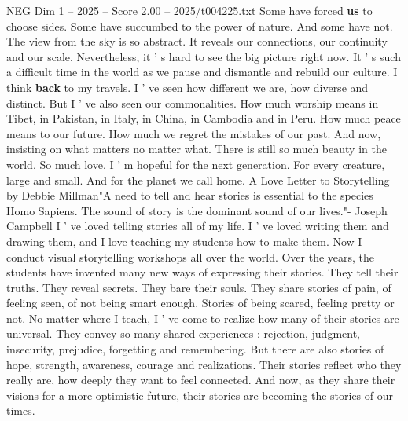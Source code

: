 \begin{textsample}{NEG Dim 1 – 2025 – Score 2.00 – 2025/t004225.txt}
Some have forced \textbf{us} to choose sides.
Some have succumbed to the power of nature.
And some have not.
The view from the sky is so abstract.
It reveals our connections, our continuity and our scale.
Nevertheless, it ' s hard to see the big picture right now.
It ' s such a difficult time in the world as we pause and dismantle and rebuild our culture.
I think \textbf{back} to my travels.
I ' ve seen how different we are, how diverse and distinct.
But I ' ve also seen our commonalities.
How much worship means in Tibet, in Pakistan, in Italy, in China, in Cambodia and in Peru.
How much peace means to our future.
How much we regret the mistakes of our past.
And now, insisting on what matters no matter what.
There is still so much beauty in the world.
So much love.
I ' m hopeful for the next generation.
For every creature, large and small.
And for the planet we call home.
A Love Letter to Storytelling by Debbie Millman"A need to tell and hear stories is essential to the species Homo Sapiens.
The sound of story is the dominant sound of our lives."- Joseph Campbell I ' ve loved telling stories all of my life.
I ' ve loved writing them and drawing them, and I love teaching my students how to make them.
Now I conduct visual storytelling workshops all over the world.
Over the years, the students have invented many new ways of expressing their stories.
They tell their truths.
They reveal secrets.
They bare their souls.
They share stories of pain, of feeling seen, of not being smart enough.
Stories of being scared, feeling pretty or not.
No matter where I teach, I ' ve come to realize how many of their stories are universal.
They convey so many shared experiences : rejection, judgment, insecurity, prejudice, forgetting and remembering.
But there are also stories of hope, strength, awareness, courage and realizations.
Their stories reflect who they really are, how deeply they want to feel connected.
And now, as they share their visions for a more optimistic future, their stories are becoming the stories of our times.

\end{textsample}
